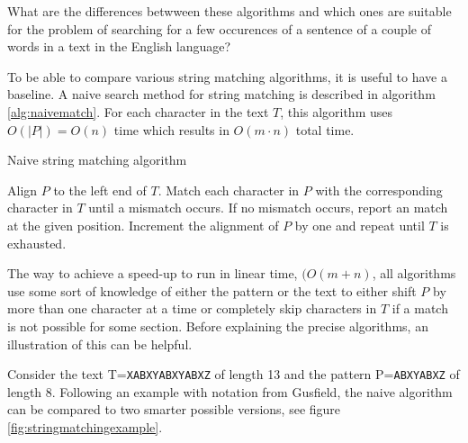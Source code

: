 What are the differences betwween these algorithms and which ones are suitable for the problem of searching for a few occurences of a sentence of a couple of words in a text in the English language? 

To be able to compare various string matching algorithms, it is useful to have a baseline. A naive search method for string matching is described in algorithm \ref{alg:naivematch}. For each character in the text $T$, this algorithm uses $O(|P|)=O(n)$ time which results in $O(m\cdot n)$ total time. 

\begin{algorithm}[t]
\caption{Naive string matching algorithm}\label{alg:naivematch}
\begin{algorithmic}
\State Align $P$ to the left end of $T$.
\State Match each character in $P$ with the corresponding character in $T$ until a mismatch occurs.
\State If no mismatch occurs, report an match at the given position.
\State Increment the alignment of $P$ by one and repeat until $T$ is exhausted. 
\end{algorithmic}
\end{algorithm}

The way to achieve a speed-up to run in linear time, $(O(m+n)$, all algorithms use some sort of knowledge of either the pattern or the text to either shift $P$ by more than one character at a time or completely skip characters in $T$ if a match is not possible for some section. Before explaining the precise algorithms, an illustration of this can be helpful. 

Consider the text T=\verb|XABXYABXYABXZ| of length 13 and the pattern P=\verb|ABXYABXZ| of length 8. Following an example with notation from Gusfield\cite{Gusfield1997AlgorithmsOS}, the naive algorithm can be compared to two smarter possible versions, see figure \ref{fig:stringmatchingexample}. 

